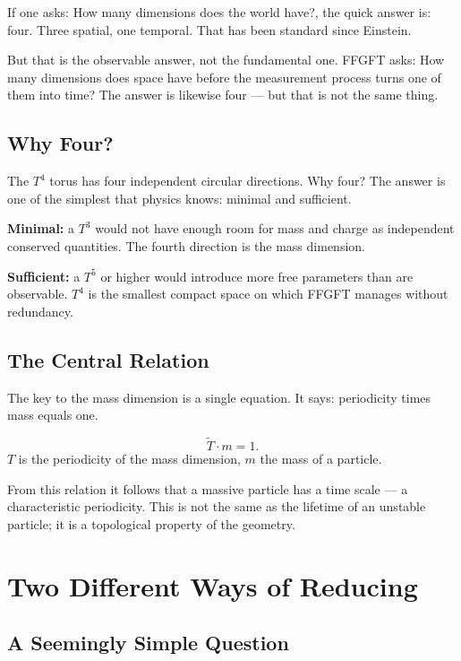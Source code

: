 \documentclass[12pt,oneside]{book}
\begin{document}
If one asks: How many dimensions does the world have?, the quick answer is: four. Three spatial, one temporal. That has been standard since Einstein.

But that is the observable answer, not the fundamental one. FFGFT asks: How many dimensions does space have before the measurement process turns one of them into time? The answer is likewise four --- but that is not the same thing.

\section{Why Four?}

The $T^4$ torus has four independent circular directions. Why four? The answer is one of the simplest that physics knows: minimal and sufficient.

\textbf{Minimal:} a $T^3$ would not have enough room for mass and charge as independent conserved quantities. The fourth direction is the mass dimension.

\textbf{Sufficient:} a $T^5$ or higher would introduce more free parameters than are observable. $T^4$ is the smallest compact space on which FFGFT manages without redundancy.

\section{The Central Relation}

The key to the mass dimension is a single equation. It says: periodicity times mass equals one.

\begin{merkbox}
\[
\tilde{T} \cdot m = 1.
\]
$T$ is the periodicity of the mass dimension, $m$ the mass of a particle.
\end{merkbox}

From this relation it follows that a massive particle has a time scale --- a characteristic periodicity. This is not the same as the lifetime of an unstable particle; it is a topological property of the geometry.

\chapter{Two Different Ways of Reducing}

\section{A Seemingly Simple Question}
\end{document}
